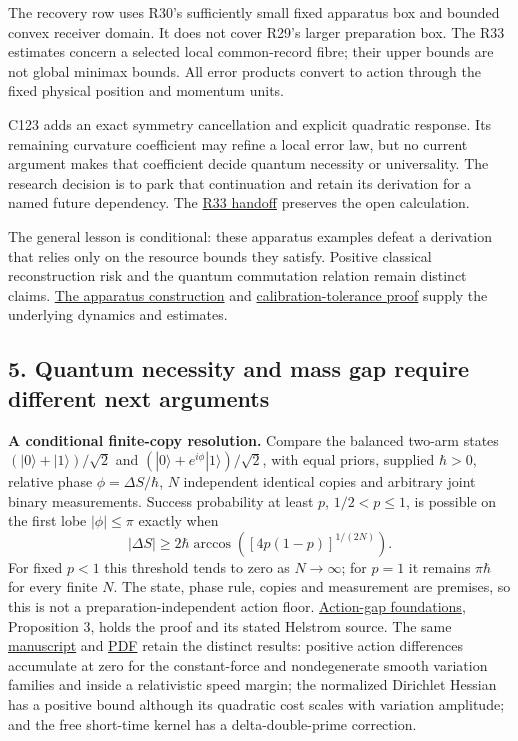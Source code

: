 \documentclass[11pt,a4paper]{article}
\begin{document}
The recovery row uses R30's sufficiently small fixed apparatus box and
bounded convex receiver domain. It does not cover R29's larger
preparation box. The R33 estimates concern a selected local
common-record fibre; their upper bounds are not global minimax bounds.
All error products convert to action through the fixed physical position
and momentum units.

C123 adds an exact symmetry cancellation and explicit quadratic
response. Its remaining curvature coefficient may refine a local error
law, but no current argument makes that coefficient decide quantum
necessity or universality. The research decision is to park that
continuation and retain its derivation for a named future dependency.
The \href{../research/handoffs/R33.md}{R33 handoff} preserves the open
calculation.

The general lesson is conditional: these apparatus examples defeat a
derivation that relies only on the resource bounds they satisfy.
Positive classical reconstruction risk and the quantum commutation
relation remain distinct claims. \href{autonomous-finite-readout.md}{The
apparatus construction} and
\href{calibration-tolerance-recovery.md}{calibration-tolerance proof}
supply the underlying dynamics and estimates.

\hypertarget{quantum-necessity-and-mass-gap-require-different-next-arguments}{%
\subsection{5. Quantum necessity and mass gap require different next
arguments}\label{quantum-necessity-and-mass-gap-require-different-next-arguments}}

\textbf{A conditional finite-copy resolution.} Compare the balanced
two-arm states \((|0\rangle+|1\rangle)/\sqrt2\) and
\((|0\rangle+e^{i\phi}|1\rangle)/\sqrt2\), with equal priors, supplied
\(\hbar>0\), relative phase \(\phi=\Delta S/\hbar\), \(N\) independent
identical copies and arbitrary joint binary measurements. Success
probability at least \(p\), \(1/2<p\le1\), is possible on the first lobe
\(|\phi|\le\pi\) exactly when
\[|\Delta S|\ge2\hbar\arccos\!\left([4p(1-p)]^{1/(2N)}\right).\] For
fixed \(p<1\) this threshold tends to zero as \(N\to\infty\); for
\(p=1\) it remains \(\pi\hbar\) for every finite \(N\). The state, phase
rule, copies and measurement are premises, so this is not a
preparation-independent action floor.
\href{../papers/action-gap-foundations.tex}{Action-gap foundations},
Proposition 3, holds the proof and its stated Helstrom source. The same
\href{../papers/action-gap-foundations.tex}{manuscript} and
\href{../out/papers/action-gap-foundations.pdf}{PDF} retain the distinct
results: positive action differences accumulate at zero for the
constant-force and nondegenerate smooth variation families and inside a
relativistic speed margin; the normalized Dirichlet Hessian has a
positive bound although its quadratic cost scales with variation
amplitude; and the free short-time kernel has a delta-double-prime
correction.
\end{document}

